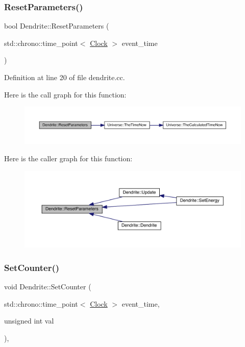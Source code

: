 \subsubsection{\texorpdfstring{Reset\+Parameters()}{ResetParameters()}}
{\footnotesize\ttfamily bool Dendrite\+::\+Reset\+Parameters (\begin{DoxyParamCaption}\item[{std\+::chrono\+::time\+\_\+point$<$ \hyperlink{universe_8h_a0ef8d951d1ca5ab3cfaf7ab4c7a6fd80}{Clock} $>$}]{event\+\_\+time }\end{DoxyParamCaption})}



Definition at line 20 of file dendrite.\+cc.

Here is the call graph for this function\+:
\nopagebreak
\begin{figure}[H]
\begin{center}
\leavevmode
\includegraphics[width=350pt]{class_dendrite_a6a6290955348051819badb801b753901_cgraph}
\end{center}
\end{figure}
Here is the caller graph for this function\+:
\nopagebreak
\begin{figure}[H]
\begin{center}
\leavevmode
\includegraphics[width=350pt]{class_dendrite_a6a6290955348051819badb801b753901_icgraph}
\end{center}
\end{figure}
\mbox{\label{class_dendrite_a7529495515de74fff2b9a92b12531057}} 
\subsubsection{\texorpdfstring{Set\+Counter()}{SetCounter()}}
{\footnotesize\ttfamily void Dendrite\+::\+Set\+Counter (\begin{DoxyParamCaption}\item[{std\+::chrono\+::time\+\_\+point$<$ \hyperlink{universe_8h_a0ef8d951d1ca5ab3cfaf7ab4c7a6fd80}{Clock} $>$}]{event\+\_\+time,  }\item[{unsigned int}]{val }\end{DoxyParamCaption})\hspace{0.3cm}{\ttfamily [inline]}, {\ttfamily [virtual]}}



